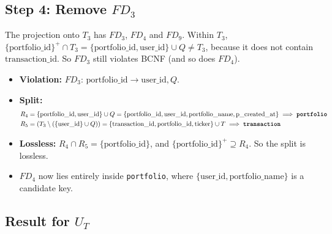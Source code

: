 \documentclass{article}
\newcommand{\at}[1]{\text{#1}}
\newcommand{\cl}[1]{\{#1\}^+}
\begin{document}
\subsection*{Step 4: Remove $FD_3$}

The projection onto $T_3$ has $FD_3$, $FD_4$ and $FD_9$. Within $T_3$, $\cl{\at{portfolio\_id}} \cap T_3 = \{\at{portfolio\_id}, \at{user\_id}\} \cup Q \neq T_3$, because it does not contain $\at{transaction\_id}$. So $FD_3$ still violates BCNF (and so does $FD_4$).
\begin{itemize}[leftmargin=*]
  \item \textbf{Violation:} $FD_3$: $\at{portfolio\_id} \rightarrow \at{user\_id}, Q$.
  \item \textbf{Split:}
  \begin{align*}
    R_4 &= \{\at{portfolio\_id}, \at{user\_id}\} \cup Q = \{\at{portfolio\_id}, \at{user\_id}, \at{portfolio\_name}, \at{p\_created\_at}\} \implies \textbf{\texttt{portfolio}} \\
    R_5 &= (T_3 \setminus (\{\at{user\_id}\} \cup Q)) = \{\at{transaction\_id}, \at{portfolio\_id}, \at{ticker}\} \cup T \implies \textbf{\texttt{transaction}}
  \end{align*}
  \item \textbf{Lossless:} $R_4 \cap R_5 = \{\at{portfolio\_id}\}$, and $\cl{\at{portfolio\_id}} \supseteq R_4$. So the split is lossless.
  \item $FD_4$ now lies entirely inside \texttt{portfolio}, where $\{\at{user\_id}, \at{portfolio\_name}\}$ is a candidate key.
\end{itemize}

\subsection*{Result for $U_T$}
\end{document}

